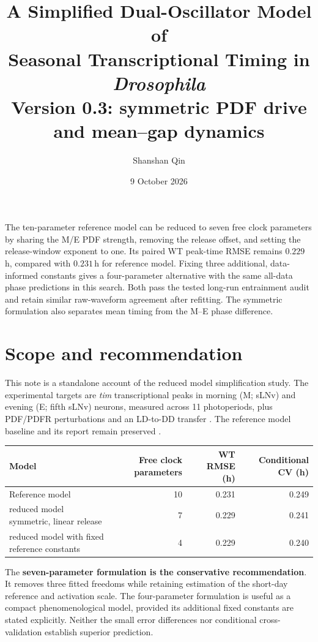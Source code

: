 \documentclass[11pt,letterpaper]{article}
\title{\textbf{A Simplified Dual-Oscillator Model of\\
Seasonal Transcriptional Timing in \textit{Drosophila}}\\[6pt]
\large Version 0.3: symmetric PDF drive and mean--gap dynamics}
\author{Shanshan Qin}
\date{9 October 2026}
\begin{document}
\maketitle

\begin{tcolorbox}[colback=blue!3,colframe=blue!30!black,boxrule=0.6pt,
 title=Purpose and main result]
The ten-parameter reference model can be reduced to seven free clock parameters
by sharing the M/E PDF strength, removing the release offset, and setting
the release-window exponent to one. Its paired WT peak-time RMSE remains
$0.229$\,h, compared with $0.231$\,h for reference model.
Fixing three additional, data-informed constants gives a four-parameter
alternative with the same all-data phase predictions in this search.
Both pass the tested long-run entrainment audit and retain similar
raw-waveform agreement after refitting. The symmetric formulation also
separates mean timing from the M--E phase difference.
\end{tcolorbox}

\section{Scope and recommendation}

This note is a standalone account of the reduced model simplification study.
The experimental targets are \textit{tim} transcriptional peaks in
morning (M; sLNv) and evening (E; fifth sLNv) neurons, measured across
11 photoperiods, plus PDF/PDFR perturbations and an LD-to-DD transfer
\cite{project}. The reference model baseline and its report remain preserved
\cite{v02}.

\begin{center}
\small
\begin{tabular}{lrrr}
\toprule
Model & Free clock parameters & WT RMSE (h) & Conditional CV (h)\\
\midrule
Reference model & 10 & 0.231 & 0.249\\
reduced model symmetric, linear release & 7 & 0.229 & 0.241\\
reduced model with fixed reference constants & 4 & 0.229 & 0.240\\
\bottomrule
\end{tabular}
\end{center}

The \textbf{seven-parameter formulation is the conservative recommendation}.
It removes three fitted freedoms while retaining estimation of the
short-day reference and activation scale. The four-parameter formulation
is useful as a compact phenomenological model, provided its additional
fixed constants are stated explicitly. Neither the small error differences
nor conditional cross-validation establish superior prediction.
\end{document}

